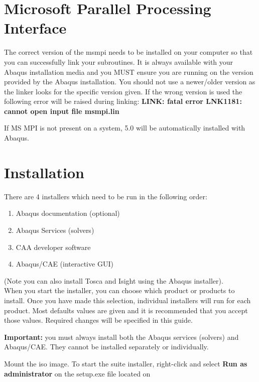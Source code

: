 \documentclass[10pt,a4paper,oneside]{article}
\begin{document}
\section{Microsoft Parallel Processing Interface}
The correct version of the msmpi needs to be installed on your computer so that you can successfully link your subroutines. It is always available with your Abaqus installation media and you MUST ensure you are running on the version provided by the Abaqus installation. You should not use a newer/older version as  the linker looks for the specific version given. If the wrong version is used the following error will be raised during linking: \textbf{LINK: fatal error LNK1181: cannot open input file  msmpi.lin}

If MS MPI is not present on a system, 5.0 will be automatically installed with Abaqus.

\section{Installation}
There are 4 installers which need to be run in the following order:
\begin{enumerate}
\item Abaqus documentation (optional)
\item Abaqus Services (solvers)
\item CAA developer software
\item Abaqus/CAE (interactive GUI)
\end{enumerate}

(Note you can also install Tosca and Isight using the Abaqus installer).
\\
When you start the installer, you can choose which product or products to install. Once you have made this selection, individual installers will run for each product. Most defaults values are given and it is recommended that you accept those values. Required changes will be specified in this guide. \bigskip

\textbf{Important:} you must always install both the Abaqus services (solvers) and Abaqus/CAE. They cannot be installed separately or individually.

\bigskip
Mount the iso image. To start the suite installer, right-click and select \textbf{Run as administrator} on the setup.exe file located on 
\end{document}

